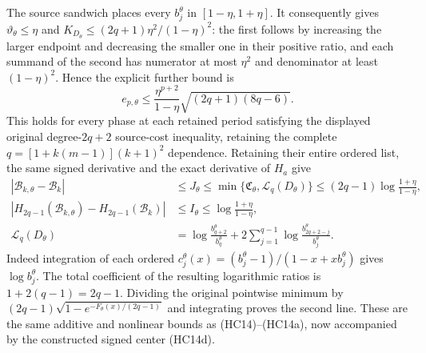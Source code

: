 The source sandwich places every $b_j^\theta$ in
$[1-\eta,1+\eta]$. It consequently gives
$\vartheta_\theta\le\eta$ and
$K_{D_\theta}\le(2q+1)\eta^2/(1-\eta)^2$: the first follows
by increasing the larger endpoint and decreasing the smaller
one in their positive ratio, and each summand of the second
has numerator at most $\eta^2$ and denominator at least
$(1-\eta)^2$. Hence the explicit further bound is
\[
 e_{p,\theta}\le
 \frac{\eta^{p+2}}{1-\eta}\sqrt{(2q+1)(8q-6)} .
\]
This holds for every phase at each retained period satisfying
the displayed original degree-$2q+2$ source-cost inequality, retaining
the complete $q=[1+k(m-1)](k+1)^2$ dependence.
Retaining their entire ordered list, the
same signed derivative and the exact derivative of $H_a$ give
\[
\begin{aligned}
 |\mathcal B_{k,\theta}-\mathcal B_k|
 &\le J_\theta\le
 \min\{\mathfrak C_\theta,\mathcal L_q(D_\theta)\}
 \le(2q-1)\log\frac{1+\eta}{1-\eta},\\
 |H_{2q-1}(\mathcal B_{k,\theta})-H_{2q-1}(\mathcal B_k)|
 &\le I_\theta\le\log\frac{1+\eta}{1-\eta},\\
 \mathcal L_q(D_\theta)
 &=\log\frac{b_{q+2}^\theta}{b_q^\theta}
   +2\sum_{j=1}^{q-1}\log\frac{b_{2q+2-j}^\theta}{b_j^\theta}.
\end{aligned}\tag{HC14e}
\]
Indeed integration of each ordered
$c_j^\theta(x)=(b_j^\theta-1)/(1-x+xb_j^\theta)$ gives
$\log b_j^\theta$. The total coefficient of the resulting
logarithmic ratios is $1+2(q-1)=2q-1$.
Dividing the original pointwise minimum by
$(2q-1)\sqrt{1-e^{-F_\theta(x)/(2q-1)}}$
and integrating proves the second line. These are the same
additive and nonlinear bounds as (HC14)--(HC14a), now
accompanied by the constructed signed center (HC14d).

